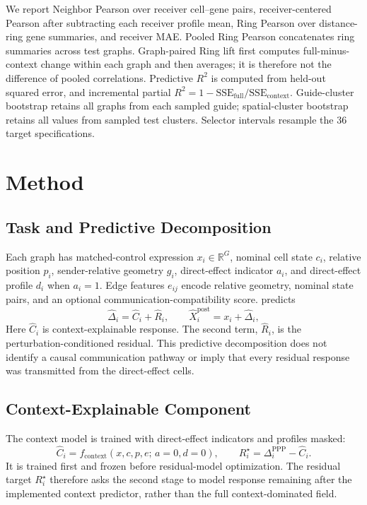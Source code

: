 We report Neighbor Pearson over receiver cell--gene pairs, receiver-centered
Pearson after subtracting each receiver profile mean, Ring Pearson over
distance-ring gene summaries, and receiver MAE. Pooled Ring Pearson concatenates
ring summaries across test graphs. Graph-paired Ring lift first computes
full-minus-context change within each graph and then averages; it is therefore
not the difference of pooled correlations. Predictive $R^2$ is computed from
held-out squared error, and incremental partial
$R^2=1-\mathrm{SSE}_{\mathrm{full}}/\mathrm{SSE}_{\mathrm{context}}$.
Guide-cluster bootstrap retains all graphs from each sampled guide;
spatial-cluster bootstrap retains all values from sampled test clusters.
Selector intervals resample the 36 target specifications.

\section{Method}
\label{sec:method}
\subsection{Task and Predictive Decomposition}
\label{sec:method_task}
Each graph has matched-control expression $x_i\in\mathbb R^G$, nominal cell
state $c_i$, relative position $p_i$, sender-relative geometry $g_i$,
direct-effect indicator $a_i$, and direct-effect profile $d_i$ when $a_i=1$.
Edge features $e_{ij}$ encode relative geometry, nominal state pairs, and an
optional communication-compatibility score. \methodname{} predicts
\begin{equation}
\widehat\Delta_i=\widehat C_i+\widehat R_i,\qquad
\widehat X_i^{\mathrm{post}}=x_i+\widehat\Delta_i ,
\label{eq:predictive_decomposition}
\end{equation}
Here $\widehat C_i$ is context-explainable response. The second term,
$\widehat R_i$, is the perturbation-conditioned residual. This predictive
decomposition does not identify a causal communication pathway or imply that
every residual response was transmitted from the direct-effect cells.

\subsection{Context-Explainable Component}
\label{sec:method_context}
The context model is trained with direct-effect indicators and profiles masked:
\begin{equation}
\widehat C_i=f_{\mathrm{context}}(x,c,p,e;\,a=0,d=0),
\qquad
R_i^\star=\Delta_i^{\mathrm{PPP}}-\widehat C_i .
\label{eq:context_residual}
\end{equation}
It is trained first and frozen before residual-model optimization. The residual
target $R_i^\star$ therefore asks the second stage to model response remaining
after the implemented context predictor, rather than the full
context-dominated field.

